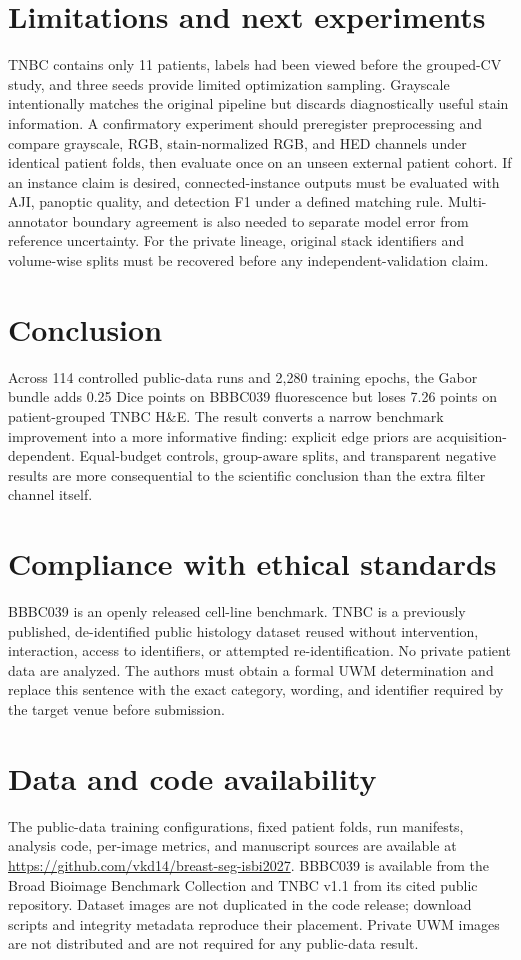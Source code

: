 \documentclass{article}
\begin{document}
\section{Limitations and next experiments}
TNBC contains only 11 patients, labels had been viewed before the grouped-CV study, and three seeds provide limited optimization sampling. Grayscale intentionally matches the original pipeline but discards diagnostically useful stain information. A confirmatory experiment should preregister preprocessing and compare grayscale, RGB, stain-normalized RGB, and HED channels under identical patient folds, then evaluate once on an unseen external patient cohort. If an instance claim is desired, connected-instance outputs must be evaluated with AJI, panoptic quality, and detection F1 under a defined matching rule. Multi-annotator boundary agreement is also needed to separate model error from reference uncertainty. For the private lineage, original stack identifiers and volume-wise splits must be recovered before any independent-validation claim.

\section{Conclusion}
Across 114 controlled public-data runs and 2,280 training epochs, the Gabor bundle adds 0.25 Dice points on BBBC039 fluorescence but loses 7.26 points on patient-grouped TNBC H\&E. The result converts a narrow benchmark improvement into a more informative finding: explicit edge priors are acquisition-dependent. Equal-budget controls, group-aware splits, and transparent negative results are more consequential to the scientific conclusion than the extra filter channel itself.

\section{Compliance with ethical standards}
BBBC039 is an openly released cell-line benchmark. TNBC is a previously published, de-identified public histology dataset reused without intervention, interaction, access to identifiers, or attempted re-identification. No private patient data are analyzed. The authors must obtain a formal UWM determination and replace this sentence with the exact category, wording, and identifier required by the target venue before submission.

\section{Data and code availability}
The public-data training configurations, fixed patient folds, run manifests, analysis code, per-image metrics, and manuscript sources are available at \url{https://github.com/vkd14/breast-seg-isbi2027}. BBBC039 is available from the Broad Bioimage Benchmark Collection and TNBC v1.1 from its cited public repository. Dataset images are not duplicated in the code release; download scripts and integrity metadata reproduce their placement. Private UWM images are not distributed and are not required for any public-data result.
\end{document}

